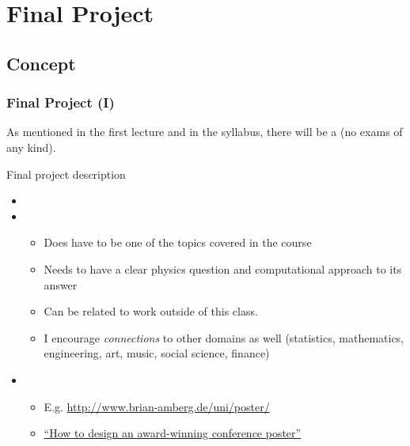 \documentclass[hyperref={colorlinks=true}]{beamer}
\begin{document}
\section[Final Project]{Final Project}

\subsection[Concept]{Concept}

\begin{frame}%
  \frametitle{Final Project (I)}

  As mentioned in the first lecture and in the syllabus, there will be a  (no exams of any kind).
  
  \vspace{0.3cm}
  
  \begin{ucblock}{Final project  description}
    \begin{itemize}
      \item {}
      \item {}
      \begin{itemize}
        \item Does  have to be one of the topics covered in the course
        \item Needs to have a clear physics question and computational approach to its answer
        \item Can be related to work outside of this class. 
        \item I encourage \textit{connections} to other domains as well (statistics, mathematics, engineering, art, music, social science, finance)
      \end{itemize}
      \item {}
      \begin{itemize}
        \item E.g. \url{http://www.brian-amberg.de/uni/poster/}
        \item \href{http://blogs.lse.ac.uk/impactofsocialsciences/2018/05/11/how-to-design-an-award-winning-conference-poster/}{``How to design an award-winning conference poster''}
      \end{itemize}
    \end{itemize}
  \end{ucblock}

  
\end{frame}
\end{document}
